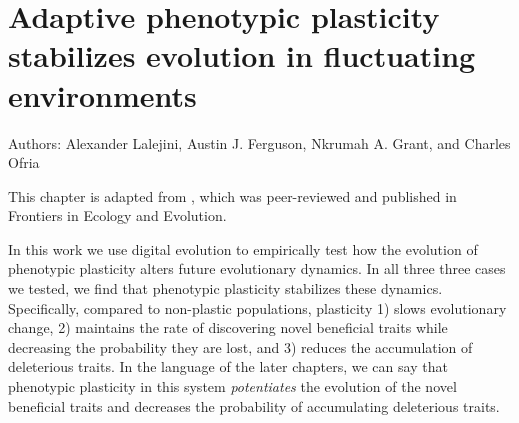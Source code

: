 \chapter[Adaptive phenotypic plasticity stabilizes evolution in fluctuating \linebreak environments]{Adaptive phenotypic plasticity stabilizes evolution in fluctuating environments}
\label{chap:consequences_of_plasticity}

\noindent
Authors: Alexander Lalejini, Austin J. Ferguson, Nkrumah A. Grant, and Charles Ofria 

\noindent This chapter is adapted from \citep{lalejiniAdaptivePhenotypicPlasticity2021}, which was peer-reviewed and published in Frontiers in Ecology and Evolution. 

In this work we use digital evolution to empirically test how the evolution of phenotypic plasticity alters future evolutionary dynamics.
In all three three cases we tested, we find that phenotypic plasticity stabilizes these dynamics. 
Specifically, compared to non-plastic populations, plasticity 1) slows evolutionary change, 2) maintains the rate of discovering novel beneficial traits while decreasing the probability they are lost, and 3) reduces the accumulation of deleterious traits.
In the language of the later chapters, we can say that phenotypic plasticity in this system \textit{potentiates} the evolution of the novel beneficial traits and decreases the probability of accumulating deleterious traits. 





\newcommand{\evolutionaryChangeRateReplicates}{100}
\newcommand{\evolutionaryChangeRatePlasticReps}{42}

